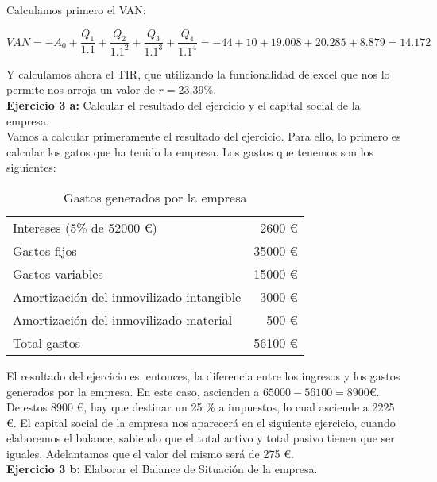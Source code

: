 \documentclass[11pt]{article}
\theoremstyle{plain}
\theoremstyle{definition}
\begin{document}
Calculamos primero el VAN:

\[
  VAN = -A_0 + \frac{Q_1}{1.1} + \frac{Q_2}{1.1^2} + \frac{Q_3}{1.1^3}
  + \frac{Q_4}{1.1^4} = -44 + 10 + 19.008 + 20.285 + 8.879 = 14.172
\]

Y calculamos ahora el TIR, que utilizando la funcionalidad de excel
que nos lo permite nos arroja un valor de $r = 23.39 \%$.\\

\textbf{Ejercicio 3 a:} Calcular el resultado del ejercicio y el
capital social de la empresa.\\

Vamos a calcular primeramente el resultado del ejercicio. Para ello,
lo primero es calcular los gatos que ha tenido la empresa. Los gastos
que tenemos son los siguientes:

\begin{table}[H]
  \centering
  \begin{tabular}{lr}
    Intereses (5\% de 52000 €) & 2600 €\\
    Gastos fijos & 35000 €\\
    Gastos variables & 15000 €\\
    Amortización del inmovilizado intangible & 3000 €\\
    Amortización del inmovilizado material & 500 €\\
    \midrule
    Total gastos & 56100 €
  \end{tabular}
  \caption{Gastos generados por la empresa}
\end{table}

El resultado del ejercicio es, entonces, la diferencia entre los
ingresos y los gastos generados por la empresa. En este caso,
ascienden a $65000 - 56100 = 8900 €$.\\

De estos 8900 €, hay que destinar un 25 \% a impuestos, lo cual
asciende a 2225 €. El capital social de la empresa nos aparecerá en el
siguiente ejercicio, cuando elaboremos el balance, sabiendo que el
total activo y total pasivo tienen que ser iguales. Adelantamos que el
valor del mismo será de 275 €.\\

\textbf{Ejercicio 3 b:} Elaborar el Balance de Situación de la
empresa.\\
\end{document}
